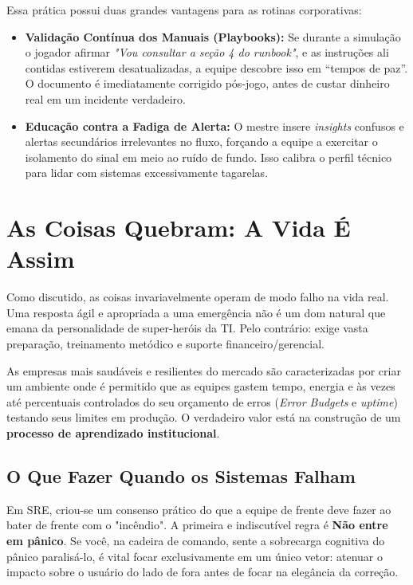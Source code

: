 \documentclass[12pt,a4paper]{report}
\begin{document}
Essa prática possui duas grandes vantagens para as rotinas corporativas:
\begin{itemize}
    \item \textbf{Validação Contínua dos Manuais (Playbooks):} Se durante a simulação o jogador afirmar \textit{"Vou consultar a seção 4 do runbook"}, e as instruções ali contidas estiverem desatualizadas, a equipe descobre isso em ``tempos de paz''. O documento é imediatamente corrigido pós-jogo, antes de custar dinheiro real em um incidente verdadeiro.
    \item \textbf{Educação contra a Fadiga de Alerta:} O mestre insere \textit{insights} confusos e alertas secundários irrelevantes no fluxo, forçando a equipe a exercitar o isolamento do sinal em meio ao ruído de fundo. Isso calibra o perfil técnico para lidar com sistemas excessivamente tagarelas.
\end{itemize}

\section{As Coisas Quebram: A Vida É Assim}

Como discutido, as coisas invariavelmente operam de modo falho na vida real. Uma resposta ágil e apropriada a uma emergência não é um dom natural que emana da personalidade de super-heróis da TI. Pelo contrário: exige vasta preparação, treinamento metódico e suporte financeiro/gerencial.

As empresas mais saudáveis e resilientes do mercado são caracterizadas por criar um ambiente onde é permitido que as equipes gastem tempo, energia e às vezes até percentuais controlados do seu orçamento de erros (\textit{Error Budgets} e \textit{uptime}) testando seus limites em produção. O verdadeiro valor está na construção de um \textbf{processo de aprendizado institucional}.

\subsection{O Que Fazer Quando os Sistemas Falham}

Em SRE, criou-se um consenso prático do que a equipe de frente deve fazer ao bater de frente com o "incêndio". A primeira e indiscutível regra é \textbf{Não entre em pânico}. Se você, na cadeira de comando, sente a sobrecarga cognitiva do pânico paralisá-lo, é vital focar exclusivamente em um único vetor: atenuar o impacto sobre o usuário do lado de fora antes de focar na elegância da correção.
\end{document}
